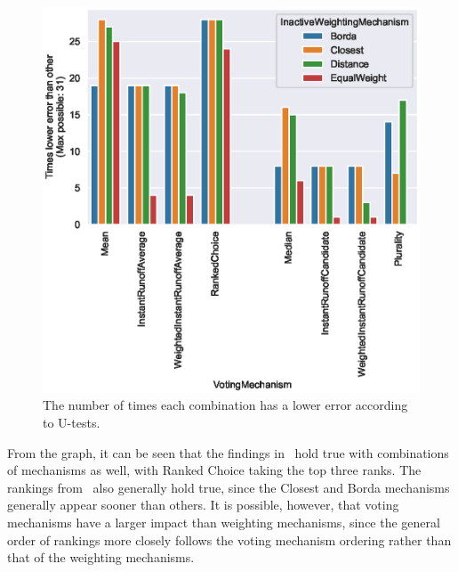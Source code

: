 \begin{figure}[htbp]
    \centering
    \includegraphics[scale=0.75]
    {./content/figures/combinations/combined_lesser_counts}
    \caption{The number of times each combination has a lower error according to
    U-tests.}
    \label{fig:combined-lesser_counts}
\end{figure}

From the graph, it can be seen that the findings
in~ hold true with combinations of
mechanisms as well, with Ranked Choice taking the top three ranks.
The rankings from~ also
generally hold true, since the Closest and Borda mechanisms generally
appear sooner than others.
It is possible, however, that voting mechanisms have a larger impact than weighting
mechanisms, since the general order of rankings more closely follows the voting
mechanism ordering rather than that of the weighting mechanisms.

%
%


